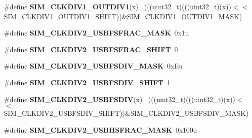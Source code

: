 \begin{DoxyCompactItemize}
\item 
\hypertarget{group___s_i_m___register___masks_gae57b95ee6dc15af2d142e6e1b193383d}{}\#define {\bfseries S\+I\+M\+\_\+\+C\+L\+K\+D\+I\+V1\+\_\+\+O\+U\+T\+D\+I\+V1}(x)                                  ~(((uint32\+\_\+t)(((uint32\+\_\+t)(x))$<$$<$S\+I\+M\+\_\+\+C\+L\+K\+D\+I\+V1\+\_\+\+O\+U\+T\+D\+I\+V1\+\_\+\+S\+H\+I\+F\+T))\&S\+I\+M\+\_\+\+C\+L\+K\+D\+I\+V1\+\_\+\+O\+U\+T\+D\+I\+V1\+\_\+\+M\+A\+S\+K)\label{group___s_i_m___register___masks_gae57b95ee6dc15af2d142e6e1b193383d}

\item 
\hypertarget{group___s_i_m___register___masks_gac1308a3762774407e10c5b6b3540481d}{}\#define {\bfseries S\+I\+M\+\_\+\+C\+L\+K\+D\+I\+V2\+\_\+\+U\+S\+B\+F\+S\+F\+R\+A\+C\+\_\+\+M\+A\+S\+K}~0x1u\label{group___s_i_m___register___masks_gac1308a3762774407e10c5b6b3540481d}

\item 
\hypertarget{group___s_i_m___register___masks_ga78ed5dfb4755b614ce53eb4a7f5888d8}{}\#define {\bfseries S\+I\+M\+\_\+\+C\+L\+K\+D\+I\+V2\+\_\+\+U\+S\+B\+F\+S\+F\+R\+A\+C\+\_\+\+S\+H\+I\+F\+T}~0\label{group___s_i_m___register___masks_ga78ed5dfb4755b614ce53eb4a7f5888d8}

\item 
\hypertarget{group___s_i_m___register___masks_gae8d82b79db3a9aa0d2325dbbc56ed5ae}{}\#define {\bfseries S\+I\+M\+\_\+\+C\+L\+K\+D\+I\+V2\+\_\+\+U\+S\+B\+F\+S\+D\+I\+V\+\_\+\+M\+A\+S\+K}~0x\+Eu\label{group___s_i_m___register___masks_gae8d82b79db3a9aa0d2325dbbc56ed5ae}

\item 
\hypertarget{group___s_i_m___register___masks_ga586ef998aeaca91ea60de45224a5ad6c}{}\#define {\bfseries S\+I\+M\+\_\+\+C\+L\+K\+D\+I\+V2\+\_\+\+U\+S\+B\+F\+S\+D\+I\+V\+\_\+\+S\+H\+I\+F\+T}~1\label{group___s_i_m___register___masks_ga586ef998aeaca91ea60de45224a5ad6c}

\item 
\hypertarget{group___s_i_m___register___masks_ga02d30b72669c6580617c91177c5633aa}{}\#define {\bfseries S\+I\+M\+\_\+\+C\+L\+K\+D\+I\+V2\+\_\+\+U\+S\+B\+F\+S\+D\+I\+V}(x)                                ~(((uint32\+\_\+t)(((uint32\+\_\+t)(x))$<$$<$S\+I\+M\+\_\+\+C\+L\+K\+D\+I\+V2\+\_\+\+U\+S\+B\+F\+S\+D\+I\+V\+\_\+\+S\+H\+I\+F\+T))\&S\+I\+M\+\_\+\+C\+L\+K\+D\+I\+V2\+\_\+\+U\+S\+B\+F\+S\+D\+I\+V\+\_\+\+M\+A\+S\+K)\label{group___s_i_m___register___masks_ga02d30b72669c6580617c91177c5633aa}

\item 
\hypertarget{group___s_i_m___register___masks_ga8e21fc8d59cdfc9986a03792ce52d470}{}\#define {\bfseries S\+I\+M\+\_\+\+C\+L\+K\+D\+I\+V2\+\_\+\+U\+S\+B\+H\+S\+F\+R\+A\+C\+\_\+\+M\+A\+S\+K}~0x100u\label{group___s_i_m___register___masks_ga8e21fc8d59cdfc9986a03792ce52d470}


\end{DoxyCompactItemize}
